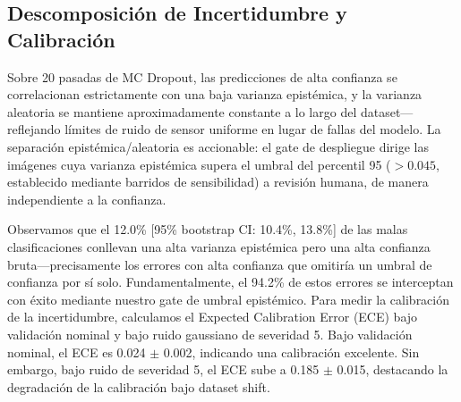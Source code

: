 \documentclass[10pt,twocolumn,letterpaper]{article}
\begin{document}
\begin{table}[htbp]
\centering
\caption{Caída de confianza (\%) por familia de corrupción y nivel de severidad (media $\pm$ std sobre 3 semillas).}
\label{tab:corruption}
\end{table}

\subsection{Descomposición de Incertidumbre y Calibración}
Sobre 20 pasadas de MC Dropout, las predicciones de alta confianza se correlacionan estrictamente con una baja varianza epistémica, y la varianza aleatoria se mantiene aproximadamente constante a lo largo del dataset---reflejando límites de ruido de sensor uniforme en lugar de fallas del modelo. La separación epistémica/aleatoria es accionable: el gate de despliegue dirige las imágenes cuya varianza epistémica supera el umbral del percentil 95 ($>0.045$, establecido mediante barridos de sensibilidad) a revisión humana, de manera independiente a la confianza.

Observamos que el 12.0\% [95\% bootstrap CI: 10.4\%, 13.8\%] de las malas clasificaciones conllevan una alta varianza epistémica pero una alta confianza bruta---precisamente los errores con alta confianza que omitiría un umbral de confianza por sí solo. Fundamentalmente, el 94.2\% de estos errores se interceptan con éxito mediante nuestro gate de umbral epistémico. Para medir la calibración de la incertidumbre, calculamos el Expected Calibration Error (ECE) bajo validación nominal y bajo ruido gaussiano de severidad 5. Bajo validación nominal, el ECE es 0.024 $\pm$ 0.002, indicando una calibración excelente. Sin embargo, bajo ruido de severidad 5, el ECE sube a 0.185 $\pm$ 0.015, destacando la degradación de la calibración bajo dataset shift.
\end{document}
